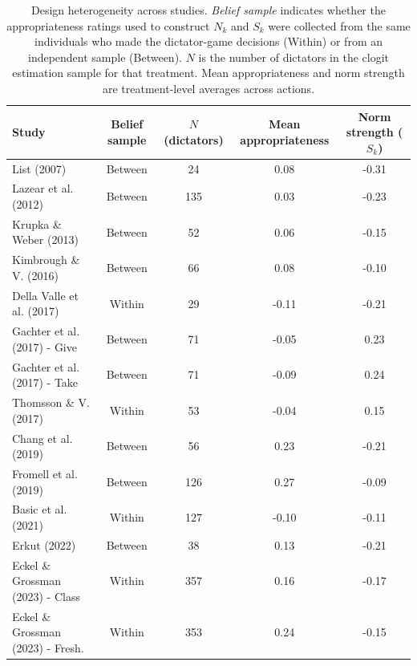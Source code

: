 \begin{table}[h!]
\centering
\begin{tabular}{lcccc}
\toprule
Study & Belief sample & $N$ (dictators) & Mean appropriateness & Norm strength ($S_k$) \\
\midrule
List (2007) & Between & 24 & 0.08 & -0.31  \\
Lazear et al. (2012) & Between & 135 & 0.03 & -0.23  \\
Krupka \& Weber (2013) & Between & 52 & 0.06 & -0.15  \\
Kimbrough \& V. (2016) & Between & 66 & 0.08 & -0.10  \\
Della Valle et al. (2017) & Within & 29 & -0.11 & -0.21  \\
Gachter et al. (2017) - Give & Between & 71 & -0.05 & 0.23  \\
Gachter et al. (2017) - Take & Between & 71 & -0.09 & 0.24  \\
Thomsson \& V. (2017) & Within & 53 & -0.04 & 0.15  \\
Chang et al. (2019) & Between & 56 & 0.23 & -0.21  \\
Fromell et al. (2019) & Between & 126 & 0.27 & -0.09  \\
Basic et al. (2021) & Within & 127 & -0.10 & -0.11  \\
Erkut (2022) & Between & 38 & 0.13 & -0.21  \\
Eckel \& Grossman (2023) - Class & Within & 357 & 0.16 & -0.17  \\
Eckel \& Grossman (2023) - Fresh. & Within & 353 & 0.24 & -0.15  \\
\bottomrule
\end{tabular}
\caption{Design heterogeneity across studies. \emph{Belief sample} indicates whether the appropriateness ratings used to construct $N_k$ and $S_k$ were collected from the same individuals who made the dictator-game decisions (Within) or from an independent sample (Between). $N$ is the number of dictators in the clogit estimation sample for that treatment. Mean appropriateness and norm strength are treatment-level averages across actions.}
\label{tab:design}
\end{table}
